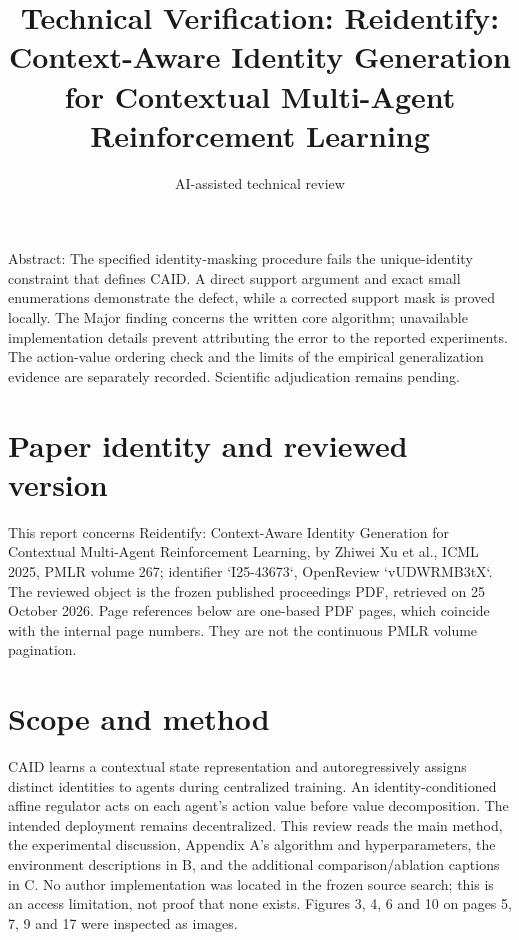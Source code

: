 \documentclass[10pt]{article}
\title{Technical Verification: Reidentify: Context-Aware Identity Generation for Contextual Multi-Agent Reinforcement Learning}
\author{AI-assisted technical review}
\date{}
\begin{document}
\maketitle
Abstract: The specified identity-masking procedure fails the unique-identity constraint that defines CAID. A direct support argument and exact small enumerations demonstrate the defect, while a corrected support mask is proved locally. The Major finding concerns the written core algorithm; unavailable implementation details prevent attributing the error to the reported experiments. The action-value ordering check and the limits of the empirical generalization evidence are separately recorded. Scientific adjudication remains pending.\par
\section*{Paper identity and reviewed version}
This report concerns Reidentify: Context-Aware Identity Generation for Contextual Multi-Agent Reinforcement Learning, by Zhiwei Xu et al., ICML 2025, PMLR volume 267; identifier `I25-43673`, OpenReview `vUDWRMB3tX`. The reviewed object is the frozen published proceedings PDF, retrieved on 25 October 2026. Page references below are one-based PDF pages, which coincide with the internal page numbers. They are not the continuous PMLR volume pagination.\par
\section*{Scope and method}
CAID learns a contextual state representation and autoregressively assigns distinct identities to agents during centralized training. An identity-conditioned affine regulator acts on each agent’s action value before value decomposition. The intended deployment remains decentralized. This review reads the main method, the experimental discussion, Appendix A’s algorithm and hyperparameters, the environment descriptions in B, and the additional comparison/ablation captions in C. No author implementation was located in the frozen source search; this is an access limitation, not proof that none exists. Figures 3, 4, 6 and 10 on pages 5, 7, 9 and 17 were inspected as images.\par
\end{document}
